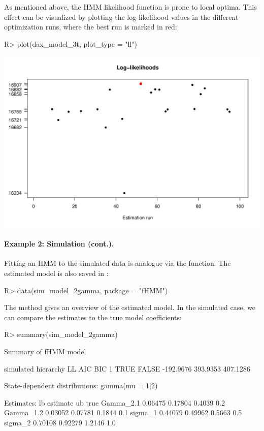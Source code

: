 \documentclass[article]{jss}
\newcommand{\fct}[1]{\code{#1()}}
\begin{document}
As mentioned above, the HMM likelihood function is prone to local optima. This effect can be visualized by plotting the log-likelihood values in the different optimization runs, where the best run is marked in red:

%
\begin{Schunk}
\begin{Sinput}
R> plot(dax_model_3t, plot_type = "ll")
\end{Sinput}
\end{Schunk}
\includegraphics{fhmm_oelschlaeger_adam_michels-dax-ll}
%

\paragraph{Example 2: Simulation (cont.).} Fitting an HMM to the simulated data is analogue via the \fct{fit\_model} function. The estimated model  is also saved in : 

%
\begin{Schunk}
\begin{Sinput}
R> data(sim_model_2gamma, package = "fHMM")
\end{Sinput}
\end{Schunk}
%

The \fct{summary} method gives an overview of the estimated model. In the simulated case, we can compare the estimates to the true model coefficients:

%
\begin{Schunk}
\begin{Sinput}
R> summary(sim_model_2gamma)
\end{Sinput}
\begin{Soutput}
Summary of fHMM model

  simulated hierarchy        LL      AIC      BIC
1      TRUE     FALSE -192.9676 393.9353 407.1286

State-dependent distributions:
gamma(mu = 1|2) 

Estimates:
               lb estimate     ub true
Gamma_2.1 0.06475  0.17804 0.4039  0.2
Gamma_1.2 0.03052  0.07781 0.1844  0.1
sigma_1   0.44079  0.49962 0.5663  0.5
sigma_2   0.70108  0.92279 1.2146  1.0
\end{Soutput}
\end{Schunk}
%
\end{document}
